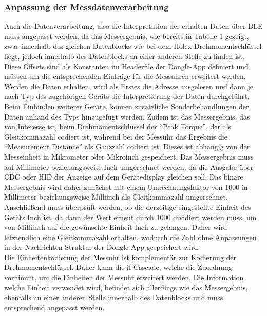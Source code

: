 \subsubsection{Anpassung der Messdatenverarbeitung}
Auch die Datenverarbeitung, also die Interpretation der erhalten Daten über \ac{BLE} muss angepasst werden, da das Messergebnis, wie bereits in Tabelle 1 gezeigt, zwar innerhalb des gleichen Datenblocks wie bei dem Holex Drehmomentschlüssel liegt, jedoch innerhalb des Datenblocks an einer anderen Stelle zu finden ist. Diese Offsets sind als Konstanten im Headerfile der Dongle-App definiert und müssen um die entsprechenden Einträge für die Messuhren erweitert werden. Werden die Daten erhalten, wird als Erstes die Adresse ausgelesen und dann je nach Typ des zugehörigen Geräts die Interpretierung der Daten durchgeführt. Beim Einbinden weiterer Geräte, können zusätzliche Sonderbehandlungen der Daten anhand des Typs hinzugefügt werden. Zudem ist das Messergebnis, das von Interesse ist, beim Drehmomentschlüssel der ``Peak Torque'', der als Gleitkommazahl codiert ist, während bei der Messuhr das Ergebnis die ``Measurement Distance'' als Ganzzahl codiert ist. Dieses ist abhängig von der Messeinheit in Mikrometer oder Mikroinch gespeichert. Das Messergebnis muss auf Millimeter beziehungsweise Inch umgerechnet werden, da die Ausgabe über \ac{CDC} oder \ac{HID} der Anzeige auf dem Gerätedisplay gleichen soll. Das binäre Messergebnis wird daher zunächst mit einem Umrechnungsfaktor von 1000 in Millimeter beziehungsweise Milliinch als Gleitkommazahl umgerechnet. Anschließend muss überprüft werden, ob die derzeitige eingestellte Einheit des Geräts Inch ist, da dann der Wert erneut durch 1000 dividiert werden muss, um von Milliinch auf die gewünschte Einheit Inch zu gelangen. Daher wird letztendlich eine Gleitkommazahl erhalten, wodurch die Zahl ohne Anpassungen in der Nachrichten Struktur der Dongle-App gespeichert wird.\\
Die Einheitenkodierung der Messuhr ist komplementär zur Kodierung der Drehmomentschlüssel. Daher kann die if-Cascade, welche die Zuordnung vornimmt, um die Einheiten der Messuhr erweitert werden. Die Information welche Einheit verwendet wird, befindet sich allerdings wie das Messergebnis, ebenfalls an einer anderen Stelle innerhalb des Datenblocks und muss entsprechend angepasst werden.


